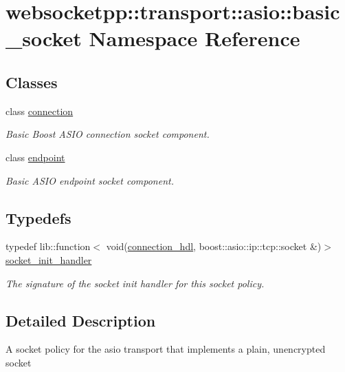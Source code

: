 \hypertarget{namespacewebsocketpp_1_1transport_1_1asio_1_1basic__socket}{}\section{websocketpp\+:\+:transport\+:\+:asio\+:\+:basic\+\_\+socket Namespace Reference}
\label{namespacewebsocketpp_1_1transport_1_1asio_1_1basic__socket}
\subsection*{Classes}
\begin{DoxyCompactItemize}
\item 
class \hyperlink{classwebsocketpp_1_1transport_1_1asio_1_1basic__socket_1_1connection}{connection}
\begin{DoxyCompactList}\small\item\em Basic Boost A\+S\+IO connection socket component. \end{DoxyCompactList}\item 
class \hyperlink{classwebsocketpp_1_1transport_1_1asio_1_1basic__socket_1_1endpoint}{endpoint}
\begin{DoxyCompactList}\small\item\em Basic A\+S\+IO endpoint socket component. \end{DoxyCompactList}\end{DoxyCompactItemize}
\subsection*{Typedefs}
\begin{DoxyCompactItemize}
\item 
typedef lib\+::function$<$ void(\hyperlink{namespacewebsocketpp_a6b3d26a10ee7229b84b776786332631d}{connection\+\_\+hdl}, boost\+::asio\+::ip\+::tcp\+::socket \&)$>$ \hyperlink{namespacewebsocketpp_1_1transport_1_1asio_1_1basic__socket_ab555b373b1b4e9af85c677c8c67db3ed}{socket\+\_\+init\+\_\+handler}\hypertarget{namespacewebsocketpp_1_1transport_1_1asio_1_1basic__socket_ab555b373b1b4e9af85c677c8c67db3ed}{}\label{namespacewebsocketpp_1_1transport_1_1asio_1_1basic__socket_ab555b373b1b4e9af85c677c8c67db3ed}

\begin{DoxyCompactList}\small\item\em The signature of the socket init handler for this socket policy. \end{DoxyCompactList}\end{DoxyCompactItemize}


\subsection{Detailed Description}
A socket policy for the asio transport that implements a plain, unencrypted socket 